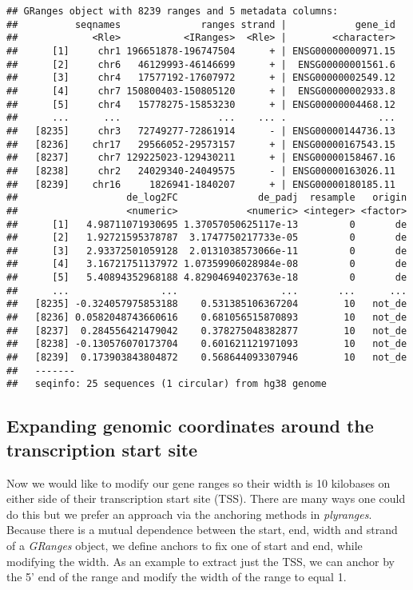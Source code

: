 \documentclass[
  9pt,
  a4paper,
]{extarticle}
\begin{document}
\begin{verbatim}
## GRanges object with 8239 ranges and 5 metadata columns:
##          seqnames              ranges strand |            gene_id
##             <Rle>           <IRanges>  <Rle> |        <character>
##      [1]     chr1 196651878-196747504      + | ENSG00000000971.15
##      [2]     chr6   46129993-46146699      + |  ENSG00000001561.6
##      [3]     chr4   17577192-17607972      + | ENSG00000002549.12
##      [4]     chr7 150800403-150805120      + |  ENSG00000002933.8
##      [5]     chr4   15778275-15853230      + | ENSG00000004468.12
##      ...      ...                 ...    ... .                ...
##   [8235]     chr3   72749277-72861914      - | ENSG00000144736.13
##   [8236]    chr17   29566052-29573157      + | ENSG00000167543.15
##   [8237]     chr7 129225023-129430211      + | ENSG00000158467.16
##   [8238]     chr2   24029340-24049575      - | ENSG00000163026.11
##   [8239]    chr16     1826941-1840207      + | ENSG00000180185.11
##                   de_log2FC              de_padj  resample   origin
##                   <numeric>            <numeric> <integer> <factor>
##      [1]   4.98711071930695 1.37057050625117e-13         0       de
##      [2]   1.92721595378787  3.1747750217733e-05         0       de
##      [3]   2.93372501059128  2.0131038573066e-11         0       de
##      [4]   3.16721751137972 1.07359906028984e-08         0       de
##      [5]   5.40894352968188 4.82904694023763e-18         0       de
##      ...                ...                  ...       ...      ...
##   [8235] -0.324057975853188    0.531385106367204        10   not_de
##   [8236] 0.0582048743660616    0.681056515870893        10   not_de
##   [8237]  0.284556421479042    0.378275048382877        10   not_de
##   [8238] -0.130576070173704    0.601621121971093        10   not_de
##   [8239]  0.173903843804872    0.568644093307946        10   not_de
##   -------
##   seqinfo: 25 sequences (1 circular) from hg38 genome
\end{verbatim}

\hypertarget{expanding-genomic-coordinates-around-the-transcription-start-site}{%
\subsection{Expanding genomic coordinates around the transcription start site}\label{expanding-genomic-coordinates-around-the-transcription-start-site}}

Now we would like to modify our gene ranges so their width is 10 kilobases on
either side of their transcription start site (TSS). There are many ways one
could do this but we prefer an approach via the anchoring methods in
\emph{plyranges}. Because there is a mutual dependence between the start, end, width
and strand of a \emph{GRanges} object, we define anchors to fix one of start and
end, while modifying the width. As an example to extract just the TSS, we can
anchor by the 5' end of the range and modify the width of the range to equal 1.
\end{document}
